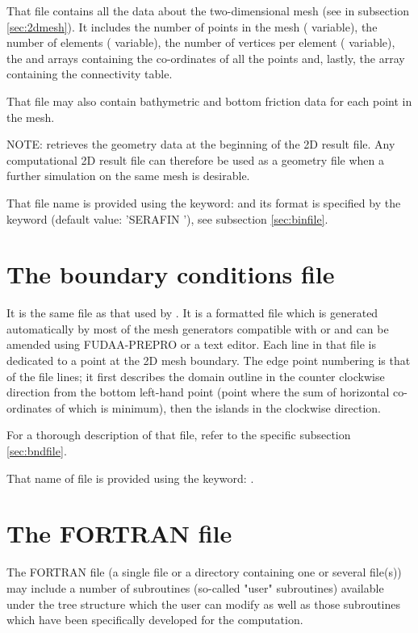 That file contains all the data about the two-dimensional mesh (see in
subsection \ref{sec:2dmesh}).
It includes the number of points in the mesh (
variable), the number of elements ( variable), the number of
vertices per element ( variable), the  and 
arrays containing the co-ordinates of all the points and, lastly,
the  array containing the connectivity table.

That file may also contain bathymetric and bottom friction data for each point
in the mesh.

NOTE:  retrieves the geometry data at the beginning of the 2D result
file. Any computational 2D result file can therefore be used as a geometry file
when a further simulation on the same mesh is desirable.

That file name is provided using the keyword:  and its
format is specified by the keyword  (default
value: 'SERAFIN '), see subsection \ref{sec:binfile}.


\section{The boundary conditions file}

It is the same file as that used by . It is a formatted file which
is generated automatically by most of the mesh generators compatible with \tel
or \stbtel and can be amended using FUDAA-PREPRO or a text editor.
Each line in that file is dedicated to a point at the 2D mesh boundary.
The edge point numbering is that of the file lines;
it first describes the domain outline in the counter clockwise direction
from the bottom left-hand point (point where the sum of horizontal co-ordinates
of which is minimum), then the islands in the clockwise direction.

For a thorough description of that file, refer to the specific subsection
\ref{sec:bndfile}.

That name of file is provided using the keyword: .


\section{The FORTRAN file}

The FORTRAN file (a single file or a directory containing one or several file(s))
may include a number of subroutines (so-called "user"
subroutines) available under the  tree structure which the user can
modify as well as those subroutines which have been specifically developed for
the computation.

